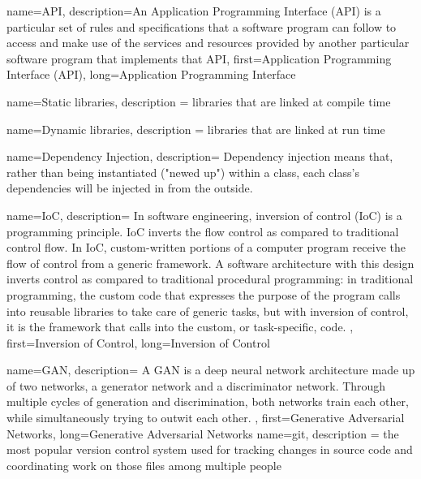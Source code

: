 {
   name={API},
   description={An Application Programming Interface (API) is a particular set
           of rules and specifications that a software program can follow to access and make use of the services and resources provided by another particular software program that implements that API},
   first={Application Programming Interface (API)},
   long={Application Programming Interface}
}

{
	name={Static libraries},
	description ={
			libraries that are linked at compile time
	}
}

{
	name={Dynamic libraries},
	description ={
			libraries that are linked at run time
	}
}


{
	name={Dependency Injection},
	description={
		Dependency injection means that, rather than being instantiated ("newed up") within a class, each class's dependencies will be injected in from the outside.
	}
}

{
	name={IoC},
	description={
		In software engineering, inversion of control (IoC) is a programming principle. IoC inverts the flow control as compared to traditional control flow. In IoC, custom-written portions of a computer program receive the flow of control from a generic framework. A software architecture with this design inverts control as compared to traditional procedural programming: in traditional programming, the custom code that expresses the purpose of the program calls into reusable libraries to take care of generic tasks, but with inversion of control, it is the framework that calls into the custom, or task-specific, code.
	},
	first={Inversion of Control},
	long={Inversion of Control}
}

{
	name={GAN},
	description={
		A GAN is a deep neural network architecture made up of two networks, a generator network and a discriminator network. Through multiple cycles of generation and discrimination, both networks train each other, while simultaneously trying to outwit each other.
	},
	first={Generative Adversarial Networks},
	long={Generative Adversarial Networks}
}
{
	name={git},
	description ={
			the most popular version control system used for tracking changes in source code and coordinating work on those files among multiple people
	}
}

